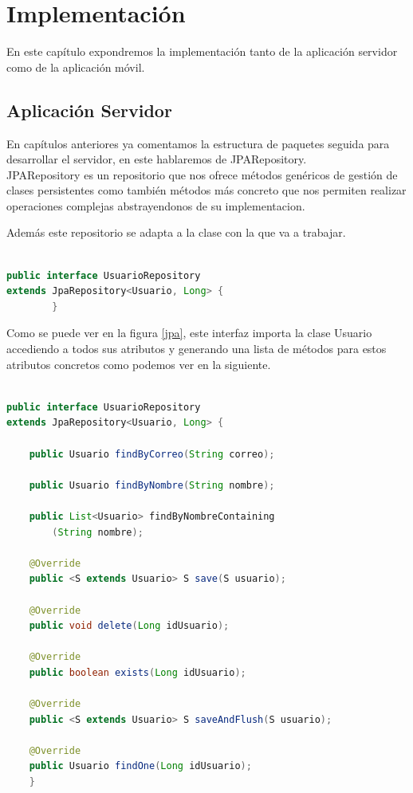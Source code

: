 
\section{Implementación}
En este capítulo expondremos la implementación tanto de la aplicación servidor como de la aplicación móvil.


\subsection{ Aplicación Servidor}
En capítulos anteriores ya comentamos la estructura de paquetes seguida para desarrollar el servidor, en este hablaremos de JPARepository.\\

JPARepository es un repositorio que nos ofrece métodos genéricos de gestión de clases persistentes como también métodos más concreto que nos permiten realizar operaciones complejas abstrayendonos de su implementacion.

Además este repositorio se adapta a la clase con la que va a trabajar.
\begin{lstlisting}[language=java,caption={Adaptación a la clase Usuario },label=DescriptiveLabel]
    
public interface UsuarioRepository 
extends JpaRepository<Usuario, Long> {
		}

\end{lstlisting} 
	



	
Como se puede ver en la figura \ref{jpa}, este interfaz importa la clase Usuario accediendo a todos sus atributos y generando una lista de métodos para estos atributos concretos como podemos ver en la siguiente.\\

\begin{lstlisting}[language=java,caption={Interfaz  de UsuarioRepository},label=jpa]
    
public interface UsuarioRepository 
extends JpaRepository<Usuario, Long> {

	public Usuario findByCorreo(String correo);

	public Usuario findByNombre(String nombre);

	public List<Usuario> findByNombreContaining
		(String nombre);

	@Override
	public <S extends Usuario> S save(S usuario);

	@Override
	public void delete(Long idUsuario);

	@Override
	public boolean exists(Long idUsuario);

	@Override
	public <S extends Usuario> S saveAndFlush(S usuario);

	@Override
	public Usuario findOne(Long idUsuario);
	}


\end{lstlisting} 









